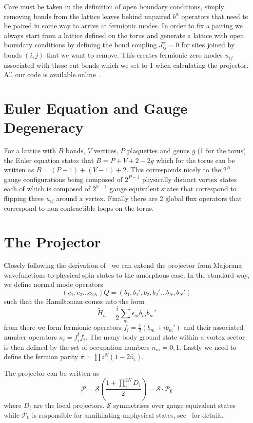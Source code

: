 Care must be taken in the definition of open boundary conditions, simply removing bonds from the lattice leaves behind unpaired \(b^\alpha\) operators that need to be paired in some way to arrive at fermionic modes. In order to fix a pairing we always start from a lattice defined on the torus and generate a lattice with open boundary conditions by defining the bond coupling \(J^{\alpha}_{ij} = 0\) for sites joined by bonds \((i,j)\) that we want to remove. This creates fermionic zero modes \(u_{ij}\) associated with these cut bonds which we set to 1 when calculating the projector. All our code is available online~\cite{koala}.

\section{Euler Equation and Gauge Degeneracy}
For a lattice with \(B\) bonds, \(V\) vertices, \(P\) plaquettes and genus \(g\) (1 for the torus) the Euler equation states that \(B = P + V + 2 - 2g\) which for the torus can be written as \(B = (P - 1) + (V - 1) + 2\). This corresponds nicely to the \(2^{B}\) gauge configurations being composed of \(2^{P - 1}\) physically distinct vortex states each of which is composed of \(2^{V - 1}\) gauge equivalent states that correspond to flipping three \(u_{ij}\) around a vertex. Finally there are 2 global flux operators that correspond to non-contractible loops on the torus.


\section{The Projector} \label{apx:projector}

Closely following the derivation of~\cite{pedrocchiPhysicalSolutionsKitaev2011} we can extend the projector from Majorana wavefunctions to physical spin states to the amorphous case. In the standard way, we define normal mode operators
\[(c_1, c_2... c_{2N}) Q = (b_1, b_1', b_2, b_2' ... b_{N}, b_{N}')\]
such that the Hamiltonian comes into the form
\[\tilde{H}_u = \frac{i}{2} \sum_m \epsilon_m b_m b_m'\]
from there we form fermionic operators \(f_i = \tfrac{1}{2} (b_m + ib_m')\)
and their associated number operators \(n_i = f^\dagger_i f_i\). The many body ground state within a vortex sector is then defined by the set of occupation numbers \(n_m = 0,1\). Lastly we need to define the fermion parity \(\hat{\pi} = \prod{i}^{N} (1 - 2\hat{n}_i)\).

The projector can be written as
\[ \mathcal{P} =  \mathcal{S} \left(\frac{1 + \prod_i^{2N} D_i}{2}\right) = \mathcal{S} \cdot \mathcal{P}_0\]
where \(D_i\) are the local projectors. \(\mathcal{S}\) symmetrises over gauge equivalent states while \(\mathcal{P}_0\) is responsible for annihilating unphysical states, see~\cite{pedrocchiPhysicalSolutionsKitaev2011} for details.

